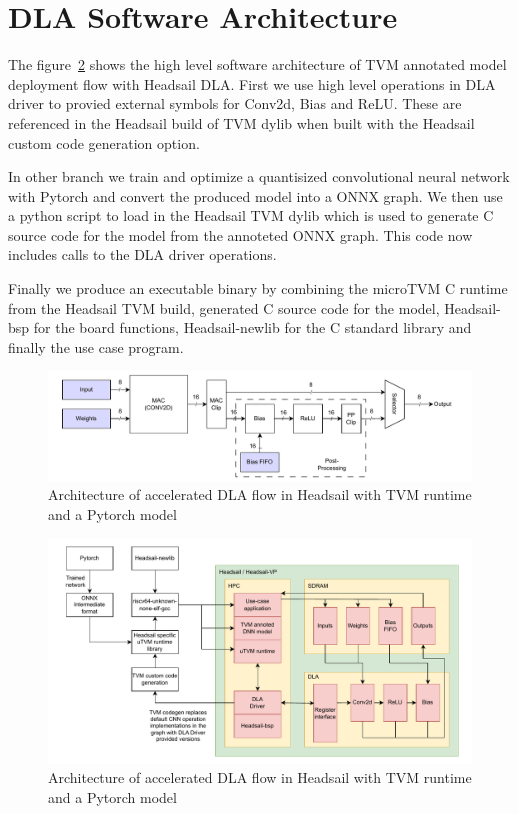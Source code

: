 \documentclass[12pt,a4paper,english
]{tunithesis}
\begin{document}
\section{DLA Software Architecture}
The figure~\ref{fig:architecture} shows the high level software architecture of TVM annotated model deployment flow with Headsail DLA. First we use high level operations in DLA driver to provied external symbols for Conv2d, Bias and ReLU. These are referenced in the Headsail build of TVM dylib when built with the Headsail custom code generation option.

In other branch we train and optimize a quantisized convolutional neural network with Pytorch and convert the produced model into a ONNX graph.
We then use a python script to load in the Headsail TVM dylib which is used to generate C source code for the model from the annoteted ONNX graph. This code now includes calls to the DLA driver operations.

Finally we produce an executable binary by combining the microTVM C runtime from the Headsail TVM build, generated C source code for the model, Headsail-bsp for the board functions, Headsail-newlib for the C standard library and finally the use case program.

\begin{figure}
  \centering
  \includegraphics[width=\linewidth]{img/dla-internal.pdf}
  \caption{Architecture of accelerated DLA flow in Headsail with TVM runtime and a Pytorch model}
  \label{fig:dla_internal}
\end{figure}


\begin{figure}
  \centering
  \includegraphics[width=\linewidth]{img/dla-architecture.pdf}
  \caption{Architecture of accelerated DLA flow in Headsail with TVM runtime and a Pytorch model}
  \label{fig:architecture}
\end{figure}
\end{document}
